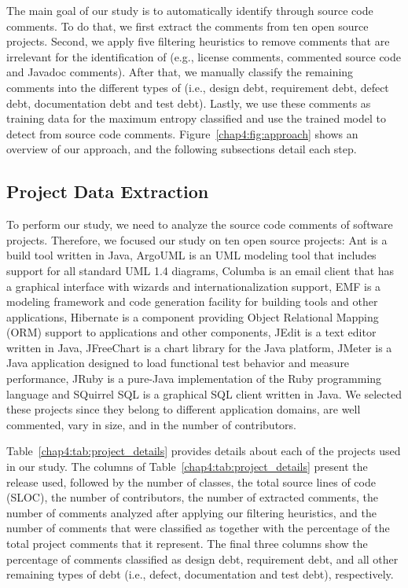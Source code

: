 The main goal of our study is to automatically identify \SATD through source code comments. To do that, we first extract the comments from ten open source projects. Second, we apply five filtering heuristics to remove comments that are irrelevant for the identification of \SATD  (e.g., license comments, commented source code and Javadoc comments). After that, we manually classify the remaining comments into the different types of \SATD (i.e., design debt, requirement debt, defect debt, documentation debt and test debt). Lastly, we use these comments as training data for the maximum entropy classified and use the trained model to detect \SATD from source code comments. Figure~\ref{chap4:fig:approach} shows an overview of our approach, and the following subsections detail each step.

\subsection{Project Data Extraction}
\label{chap4:sub:data_extraction}

To perform our study, we need to analyze the source code comments of software projects. Therefore, we focused our study on ten open source projects: Ant is a build tool written in Java, ArgoUML is an UML modeling tool that includes support for all standard UML 1.4 diagrams, Columba is an email client that has a graphical interface with wizards and internationalization support, EMF is a modeling framework and code generation facility for building tools and other applications, Hibernate is a component providing Object Relational Mapping (ORM) support to applications and other components, JEdit is a text editor written in Java, JFreeChart is a chart library for the Java platform, JMeter is a Java application designed to load functional test behavior and measure performance, JRuby is a pure-Java implementation of the Ruby programming language and SQuirrel SQL is a graphical SQL client written in Java. We selected these projects since they belong to different application domains, are well commented, vary in size, and in the number of contributors. 
    
Table~\ref{chap4:tab:project_details} provides details about each of the projects used in our study. The columns of Table~\ref{chap4:tab:project_details} present the release used, followed by the number of classes, the total source lines of code (SLOC), the number of contributors, the number of extracted comments, the number of comments analyzed after applying our filtering heuristics, and the number of comments that were classified as \SATD together with the percentage of the total project comments that it represent.
The final three columns show the percentage of \SATD comments classified as design debt, requirement debt, and all other remaining types of debt (i.e., defect, documentation and test debt), respectively. 

